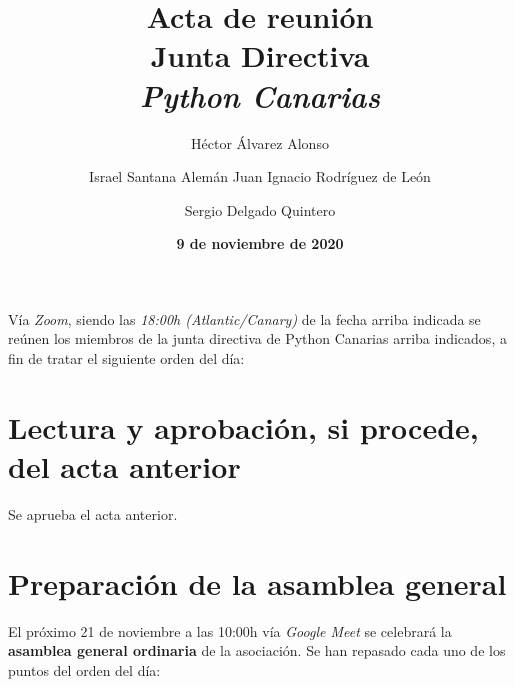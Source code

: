 \documentclass[a4paper, 12pt]{article}
\title{\huge \textbf{Acta de reunión} \\ Junta Directiva \\ \textit{Python Canarias}}
\date{\textbf{9 de noviembre de 2020}}
\author{
    Héctor Álvarez Alonso \and
    Israel Santana Alemán
    Juan Ignacio Rodríguez de León \and 
    Sergio Delgado Quintero \and
}
\begin{document}
\renewcommand{\contentsname}{Orden del día}

\maketitle

Vía \textit{Zoom}, siendo las \textit{18:00h (Atlantic/Canary)} de la fecha arriba indicada se reúnen los miembros de la junta directiva de Python Canarias arriba indicados, a fin de tratar el siguiente orden del día:

\tableofcontents

\section{Lectura y aprobación, si procede, del acta anterior}

Se aprueba el acta anterior.

\section{Preparación de la asamblea general}

El próximo 21 de noviembre a las 10:00h vía \textit{Google Meet} se celebrará la \textbf{asamblea general ordinaria} de la asociación. Se han repasado cada uno de los puntos del orden del día:
\end{document}
